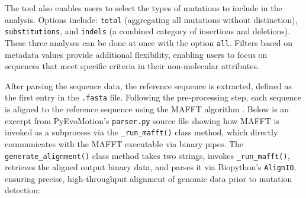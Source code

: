 The tool also enables users to select the types of mutations to include in the analysis. Options include: \texttt{total} (aggregating all mutations without distinction), \texttt{substitutions}, and \texttt{indels} (a combined category of insertions and deletions). These three analyses can be done at once with the option \texttt{all}. Filters based on metadata values provide additional flexibility, enabling users to focus on sequences that meet specific criteria in their non-molecular attributes.

After parsing the sequence data, the reference sequence is extracted, defined as the first entry in the \texttt{.fasta} file. Following the pre-processing step, each sequence is aligned to the reference sequence using the MAFFT algorithm \cite{katoh2013}. Below is an excerpt from PyEvoMotion's \texttt{parser.py} source file showing how MAFFT is invoked as a subprocess via the \texttt{\_run\_mafft()} class method, which directly communicates with the MAFFT executable via binary pipes. The \texttt{generate\_alignment()} class method takes two strings, invokes \texttt{\_run\_mafft()}, retrieves the aligned output binary data, and parses it via Biopython's \texttt{AlignIO}, ensuring precise, high-throughput alignment of genomic data prior to mutation detection:

